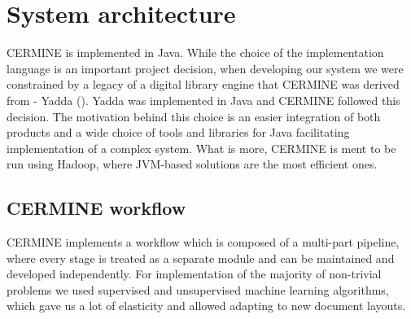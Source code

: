 \chapter{System architecture}
CERMINE is implemented in Java. While the choice of the implementation language is an important project decision, when developing our system we were constrained by a legacy of a digital library engine that CERMINE was derived from - Yadda (\cite{Yadda}). Yadda was implemented in Java and CERMINE followed this decision. The motivation behind this choice is an easier integration of both products and a wide choice of tools and libraries for Java facilitating implementation of a complex system. What is more, CERMINE is ment to be run using Hadoop, where JVM-based solutions are the most efficient ones.

\section{CERMINE workflow}
CERMINE implements a workflow which is composed of a multi-part pipeline, where every stage is treated as a separate module and can be maintained and developed independently. For implementation of the majority of non-trivial problems we used supervised and unsupervised machine learning algorithms, which gave us a lot of elasticity and allowed adapting to new document layouts.

